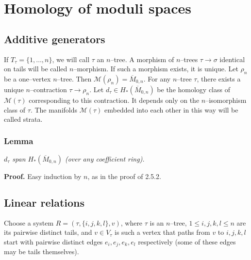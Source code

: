\documentclass[reqno]{amsart}
\theoremstyle{definition}
\begin{document}
\newpage

\section{Homology of moduli spaces}

\subsection{Additive generators}
If $T_{\tau}=\{ 1,\dots ,n\} $, we will call
$\tau$ an $n$--tree. A morphism of $n$--trees $\tau \to \sigma$
identical on tails
will be called $n$--morphism. If such a morphism exists, it is unique.
Let $\rho_n$ be a one--vertex $n$--tree.
Then $\mathcal{M}(\rho_n)=\overline{M}_{0,n}$.
For any $n$--tree $\tau $,
there exists a unique $n$--contraction $\tau\to\rho_n$. Let
$d_{\tau}\in H_*(\overline{M}_{0,n})$ be the homology class of
$\mathcal{M}(\tau )$ corresponding to this contraction. It depends
only on the $n$--isomorphism class of $\tau $. The manifolds
$\mathcal{M}(\tau )$ embedded into each other in this way will be called
strata.

\medskip

\subsubsection{Lemma}
{\it
  $d_{\tau}$ span $H_*(\overline{M}_{0,n})$
  (over any coefficient ring).
}

\smallskip

\textbf{Proof.}
Easy induction by $n$, as in the proof of 2.5.2.

\medskip

\subsection{Linear relations}
Choose a system $R=(\tau ,\{ i,j,k,l\} ,v)$,
where $\tau$ is an $n$--tree, $1\le i,j,k,l\le n$ are its pairwise
distinct tails, and $v\in V_{\tau}$ is such a vertex that paths
from $v$ to $i,j,k,l$ start with pairwise distinct edges
$e_i,e_j,e_k,e_l$ respectively (some of these edges may be tails
themselves).
\end{document}

